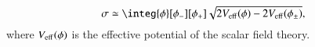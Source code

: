     \begin{equation}\label{eq:pertwalls:thinwall:surface_tension}
        \sigma\simeq \integ{\phi}[\phi_-][\phi_+] \sqrt{ 2V\ped{eff}(\phi)-2V\ped{eff}(\phi_\pm) },
    \end{equation}
    where $V_\mathrm{eff}(\phi)$ is the effective potential of the scalar field theory.



















